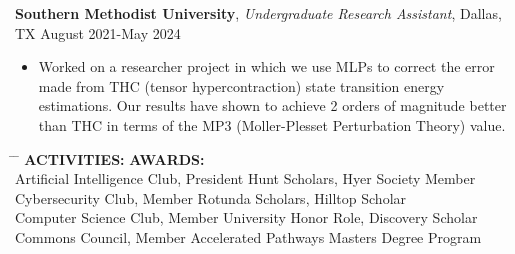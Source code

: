 \documentclass[a4paper,10pt]{article}
\begin{document}
\noindent\textbf{Southern Methodist University}, \textit{Undergraduate Research Assistant}, Dallas, TX \hfill August 2021-May 2024
\begin{itemize}[noitemsep,topsep=0pt]
  \item Worked on a researcher project in which we use MLPs to correct the error made from THC (tensor hypercontraction) state transition energy estimations. Our results have shown to achieve 2 orders of magnitude better than THC in terms of the MP3 (Moller-Plesset Perturbation Theory) value.
\end{itemize}


\newpage

\begin{tabbing}
\hspace{4in} \= \hspace{2in} \= \kill
\textbf{ACTIVITIES:} \> \textbf{AWARDS:} \\
Artificial Intelligence Club, President \> Hunt Scholars, Hyer Society Member \\
Cybersecurity Club, Member \> Rotunda Scholars, Hilltop Scholar  \\
Computer Science Club, Member \> University Honor Role, Discovery Scholar \\
Commons Council, Member \> Accelerated Pathways Masters Degree Program \\
\end{tabbing}




\vspace{0pt}
 \vspace{1pt}
\end{document}

